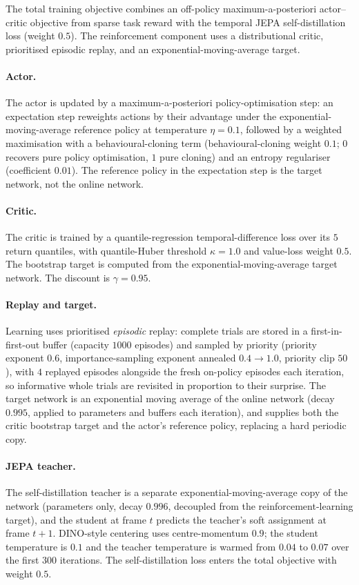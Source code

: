 The total training objective combines an off-policy maximum-a-posteriori
actor--critic objective from sparse task reward with the temporal JEPA
self-distillation loss (weight $0.5$). The reinforcement component uses a
distributional critic, prioritised episodic replay, and an exponential-moving-average target.

\paragraph{Actor.}
The actor is updated by a maximum-a-posteriori policy-optimisation step:
an expectation step reweights actions by their advantage under the
exponential-moving-average reference policy at temperature $\eta = 0.1$,
followed by a weighted maximisation with a behavioural-cloning term
(behavioural-cloning weight $0.1$; $0$ recovers pure policy optimisation,
$1$ pure cloning) and an entropy regulariser (coefficient $0.01$). The
reference policy in the expectation step is the target network, not the
online network.

\paragraph{Critic.}
The critic is trained by a quantile-regression temporal-difference loss
over its $5$ return quantiles, with quantile-Huber threshold
$\kappa = 1.0$ and value-loss weight $0.5$. The bootstrap target is
computed from the exponential-moving-average target network. The discount
is $\gamma = 0.95$.

\paragraph{Replay and target.}
Learning uses prioritised \emph{episodic} replay: complete trials are
stored in a first-in-first-out buffer (capacity $1000$ episodes) and
sampled by priority (priority exponent $0.6$, importance-sampling exponent
annealed $0.4 \to 1.0$, priority clip $50$), with $4$ replayed episodes
alongside the fresh on-policy episodes each iteration, so informative
whole trials are revisited in proportion to their surprise. The target
network is an exponential moving average of the online network (decay
$0.995$, applied to parameters and buffers each iteration), and supplies
both the critic bootstrap target and the actor's reference policy,
replacing a hard periodic copy.

\paragraph{JEPA teacher.}
The self-distillation teacher is a separate exponential-moving-average copy
of the network (parameters only, decay $0.996$, decoupled from the
reinforcement-learning target), and the student at frame $t$ predicts the
teacher's soft assignment at frame $t+1$. DINO-style centering uses
centre-momentum $0.9$; the student temperature is $0.1$ and the teacher
temperature is warmed from $0.04$ to $0.07$ over the first $300$
iterations. The self-distillation loss enters the total objective with
weight $0.5$.


